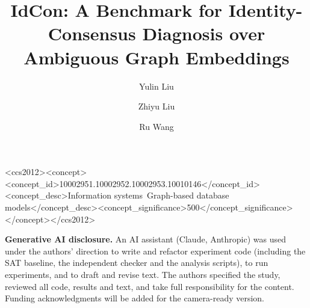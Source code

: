 \documentclass[sigconf,review]{acmart}
\begin{document}
\title{IdCon: A Benchmark for Identity-Consensus Diagnosis over Ambiguous Graph Embeddings}
\author{Yulin Liu}
\author{Zhiyu Liu}
\authornotemark[1]
\author{Ru Wang}
\renewcommand{\shortauthors}{Liu et al.}

\begin{abstract}

\end{abstract}

\begin{CCSXML}
<ccs2012><concept><concept_id>10002951.10002952.10002953.10010146</concept_id><concept_desc>Information systems~Graph-based database models</concept_desc><concept_significance>500</concept_significance></concept></ccs2012>
\end{CCSXML}
\maketitle



\begin{acks}
\textbf{Generative AI disclosure.} An AI assistant (Claude, Anthropic) was used under the authors' direction to write and refactor experiment code (including the SAT baseline, the independent checker and the analysis scripts), to run experiments, and to draft and revise text. The authors specified the study, reviewed all code, results and text, and take full responsibility for the content. Funding acknowledgments will be added for the camera-ready version.
\end{acks}



\clearpage
\appendix

\clearpage
\end{document}
